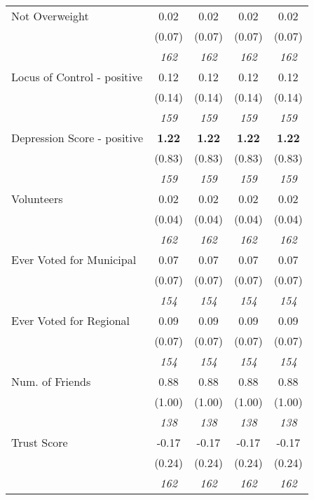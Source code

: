 \begin{tabular}{l c c c c}
Not Overweight & 0.02 & 0.02 & 0.02 & 0.02 \\
& (0.07) & (0.07) & (0.07) & (0.07) \\
& \textit{ 162 } & \textit{ 162 } & \textit{ 162 } & \textit{ 162 } \\
Locus of Control - positive & 0.12 & 0.12 & 0.12 & 0.12 \\
& (0.14) & (0.14) & (0.14) & (0.14) \\
& \textit{ 159 } & \textit{ 159 } & \textit{ 159 } & \textit{ 159 } \\
Depression Score - positive & \textbf{ 1.22 } & \textbf{ 1.22 } & \textbf{ 1.22 } & \textbf{ 1.22 } \\
& (0.83) & (0.83) & (0.83) & (0.83) \\
& \textit{ 159 } & \textit{ 159 } & \textit{ 159 } & \textit{ 159 } \\
Volunteers & 0.02 & 0.02 & 0.02 & 0.02 \\
& (0.04) & (0.04) & (0.04) & (0.04) \\
& \textit{ 162 } & \textit{ 162 } & \textit{ 162 } & \textit{ 162 } \\
Ever Voted for Municipal & 0.07 & 0.07 & 0.07 & 0.07 \\
& (0.07) & (0.07) & (0.07) & (0.07) \\
& \textit{ 154 } & \textit{ 154 } & \textit{ 154 } & \textit{ 154 } \\
Ever Voted for Regional & 0.09 & 0.09 & 0.09 & 0.09 \\
& (0.07) & (0.07) & (0.07) & (0.07) \\
& \textit{ 154 } & \textit{ 154 } & \textit{ 154 } & \textit{ 154 } \\
Num. of Friends & 0.88 & 0.88 & 0.88 & 0.88 \\
& (1.00) & (1.00) & (1.00) & (1.00) \\
& \textit{ 138 } & \textit{ 138 } & \textit{ 138 } & \textit{ 138 } \\
Trust Score & -0.17 & -0.17 & -0.17 & -0.17 \\
& (0.24) & (0.24) & (0.24) & (0.24) \\
& \textit{ 162 } & \textit{ 162 } & \textit{ 162 } & \textit{ 162 } \\
\bottomrule
\end{tabular}
